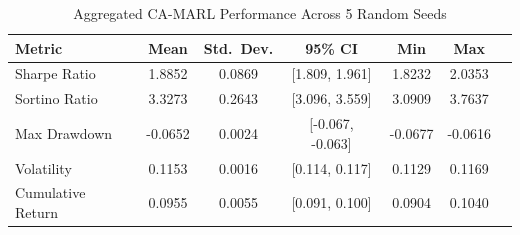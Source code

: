\begin{table}[t]
\centering
\caption{Aggregated CA-MARL Performance Across 5 Random Seeds}
\label{tab:summary}
\begin{tabular}{lcccccc}
\toprule
Metric & Mean & Std.\ Dev. & 95\% CI & Min & Max \\
\midrule
  Sharpe Ratio & 1.8852 & 0.0869 & [1.809, 1.961] & 1.8232 & 2.0353 \\
  Sortino Ratio & 3.3273 & 0.2643 & [3.096, 3.559] & 3.0909 & 3.7637 \\
  Max Drawdown & -0.0652 & 0.0024 & [-0.067, -0.063] & -0.0677 & -0.0616 \\
  Volatility & 0.1153 & 0.0016 & [0.114, 0.117] & 0.1129 & 0.1169 \\
  Cumulative Return & 0.0955 & 0.0055 & [0.091, 0.100] & 0.0904 & 0.1040 \\
\bottomrule
\end{tabular}
\end{table}